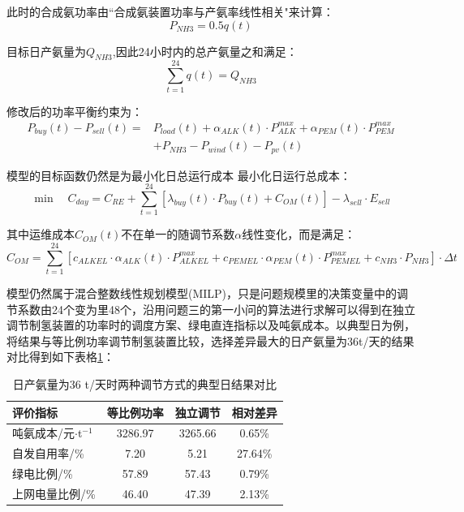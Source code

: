 此时的合成氨功率由``合成氨装置功率与产氨率线性相关"来计算：
\begin{equation}
P_{NH3} = 0.5q(t)
\end{equation}

目标日产氨量为$Q_{NH3}$,因此24小时内的总产氨量之和满足：
\begin{equation}
\sum_{t=1}^{24} q(t) = Q_{NH3}
\end{equation}

修改后的功率平衡约束为：
\begin{equation}
\begin{split}
P_{buy}(t) - P_{sell}(t) = & P_{load}(t) + \alpha_{ALK}(t) \cdot P_{ALK}^{max} + \alpha_{PEM}(t) \cdot P_{PEM}^{max} \\
& + P_{NH3} - P_{wind}(t) - P_{pv}(t)
\end{split}
\end{equation}

模型的目标函数仍然是为最小化日总运行成本
最小化日运行总成本：
\begin{equation}\label{eq:q3_obj}
\min \quad C_{day} = C_{RE} + \sum_{t=1}^{24} [\lambda_{buy}(t) \cdot P_{buy}(t) + C_{OM}(t)] - \lambda_{sell} \cdot E_{sell}
\end{equation}

其中运维成本$C_{OM}(t)$不在单一的随调节系数$\alpha$线性变化，而是满足：
\begin{equation}
C_{OM} = \sum_{t=1}^{24} [c_{ALKEL} \cdot \alpha_{ALK}(t) \cdot P_{ALKEL}^{max} + c_{PEMEL} \cdot \alpha_{PEM}(t) \cdot P_{PEMEL}^{max} + c_{NH3} \cdot P_{NH3}] \cdot \Delta t
\end{equation}

模型仍然属于混合整数线性规划模型(MILP)，只是问题规模里的决策变量中的调节系数由24个变为里48个，沿用问题三的第一小问的算法进行求解可以得到在独立调节制氢装置的功率时的调度方案、绿电直连指标以及吨氨成本。以典型日为例，将结果与等比例功率调节制氢装置比较，选择差异最大的日产氨量为36t/天的结果对比得到如下表格\ref{tab:q3_36_comparison}：

\begin{table}[H]
\centering
\caption{日产氨量为36 t/天时两种调节方式的典型日结果对比}
\label{tab:q3_36_comparison}
\begin{tabular}{lccc}
\toprule
评价指标 & 等比例功率 & 独立调节 & 相对差异 \\
\midrule
吨氨成本/元$\cdot$t$^{-1}$ & 3286.97 & 3265.66 & 0.65\% \\
自发自用率/\% & 7.20 & 5.21 & 27.64\% \\
绿电比例/\% & 57.89 & 57.43 & 0.79\% \\
上网电量比例/\% & 46.40 & 47.39 & 2.13\% \\
\bottomrule
\end{tabular}
\end{table}


